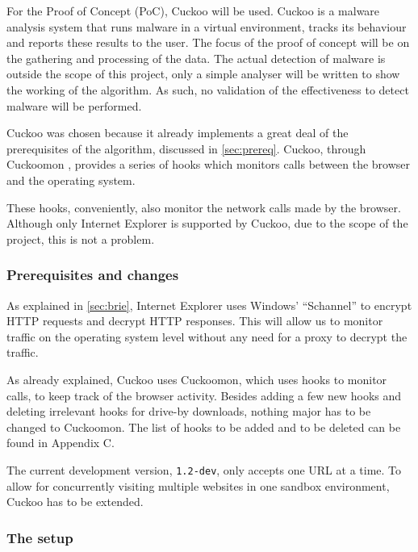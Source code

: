 
For the Proof of Concept (PoC), Cuckoo \cite{cuckoo} will be used. Cuckoo is a malware analysis system that runs malware in a virtual environment, tracks its behaviour and reports these results to the user. The focus of the proof of concept will be on the gathering and processing of the data. The actual detection of malware is outside the scope of this project, only a simple analyser will be written to show the working of the algorithm. As such, no validation of the effectiveness to detect malware will be performed. 

Cuckoo was chosen because it already implements a great deal of the prerequisites of the algorithm, discussed in \ref{sec:prereq}. Cuckoo, through Cuckoomon \cite{cuckoomon}, provides a series of hooks which monitors calls between the browser and the operating system.

These hooks, conveniently, also monitor the network calls made by the browser. Although only Internet Explorer is supported by Cuckoo, due to the scope of the project, this is not a problem.

\subsubsection{Prerequisites and changes}

As explained in \ref{sec:brie}, Internet Explorer uses Windows' ``Schannel'' \cite{schannel} to encrypt HTTP requests and decrypt HTTP responses. This will allow us to monitor traffic on the operating system level without any need for a proxy to decrypt the traffic.

As already explained, Cuckoo uses Cuckoomon, which uses hooks to monitor calls, to keep track of the browser activity. Besides adding a few new hooks and deleting irrelevant hooks for drive-by downloads, nothing major has to be changed to Cuckoomon. The list of hooks to be added and to be deleted can be found in Appendix C.

The current development version, \texttt{1.2-dev},  only accepts one URL at a time. To allow for concurrently visiting multiple websites in one sandbox environment, Cuckoo has to be extended.

\subsubsection{The setup}
\label{sec:setup}

